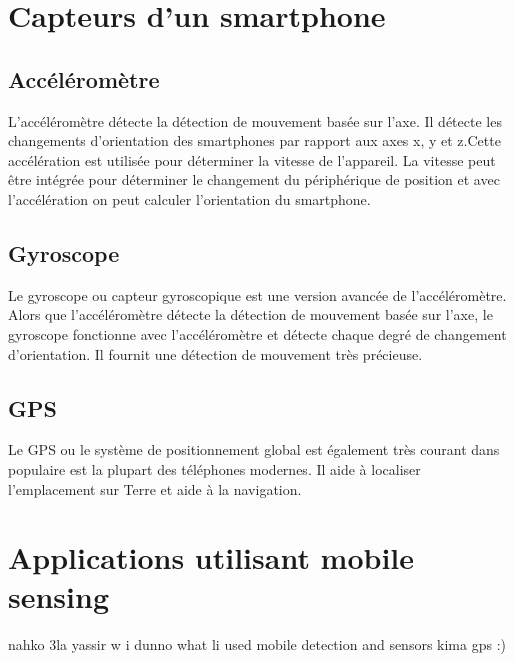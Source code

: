  \section{Capteurs d'un smartphone} 

 \subsection{Accéléromètre}
 L'accéléromètre détecte la détection de mouvement basée sur l'axe. Il détecte les changements d'orientation des smartphones par rapport aux axes x, y et z.Cette accélération est utilisée pour déterminer la vitesse de l’appareil. La vitesse peut être intégrée pour déterminer le changement du périphérique de position et avec l’accélération on peut calculer l’orientation du smartphone.

 \subsection{Gyroscope}
Le gyroscope ou capteur gyroscopique est une version avancée de l'accéléromètre. Alors que l'accéléromètre détecte la détection de mouvement basée sur l'axe, le gyroscope fonctionne avec l'accéléromètre et détecte chaque degré de changement d'orientation. Il fournit une détection de mouvement très précieuse.

\subsection{GPS}
Le GPS ou le système de positionnement global est également très courant dans populaire est la plupart des téléphones modernes. Il aide à localiser l'emplacement sur Terre et aide à la navigation.
\section{Applications utilisant mobile sensing}
nahko 3la yassir w i dunno what li used mobile detection and sensors kima gps :)


